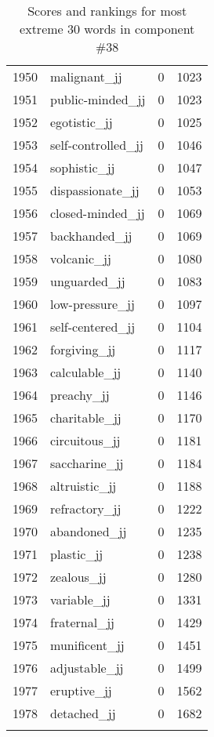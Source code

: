 \begin{longtable}[!htbp]{| rlr@{.}l |}
    1950 & malignant\_jj & 0 & 1023 \\
    1951 & public-minded\_jj & 0 & 1023 \\
    1952 & egotistic\_jj & 0 & 1025 \\
    1953 & self-controlled\_jj & 0 & 1046 \\
    1954 & sophistic\_jj & 0 & 1047 \\
    1955 & dispassionate\_jj & 0 & 1053 \\
    1956 & closed-minded\_jj & 0 & 1069 \\
    1957 & backhanded\_jj & 0 & 1069 \\
    1958 & volcanic\_jj & 0 & 1080 \\
    1959 & unguarded\_jj & 0 & 1083 \\
    1960 & low-pressure\_jj & 0 & 1097 \\
    1961 & self-centered\_jj & 0 & 1104 \\
    1962 & forgiving\_jj & 0 & 1117 \\
    1963 & calculable\_jj & 0 & 1140 \\
    1964 & preachy\_jj & 0 & 1146 \\
    1965 & charitable\_jj & 0 & 1170 \\
    1966 & circuitous\_jj & 0 & 1181 \\
    1967 & saccharine\_jj & 0 & 1184 \\
    1968 & altruistic\_jj & 0 & 1188 \\
    1969 & refractory\_jj & 0 & 1222 \\
    1970 & abandoned\_jj & 0 & 1235 \\
    1971 & plastic\_jj & 0 & 1238 \\
    1972 & zealous\_jj & 0 & 1280 \\
    1973 & variable\_jj & 0 & 1331 \\
    1974 & fraternal\_jj & 0 & 1429 \\
    1975 & munificent\_jj & 0 & 1451 \\
    1976 & adjustable\_jj & 0 & 1499 \\
    1977 & eruptive\_jj & 0 & 1562 \\
    1978 & detached\_jj & 0 & 1682 \\
    \hline
    \caption{Scores and rankings for most extreme 30 words in component \#38} \\
\end{longtable}
